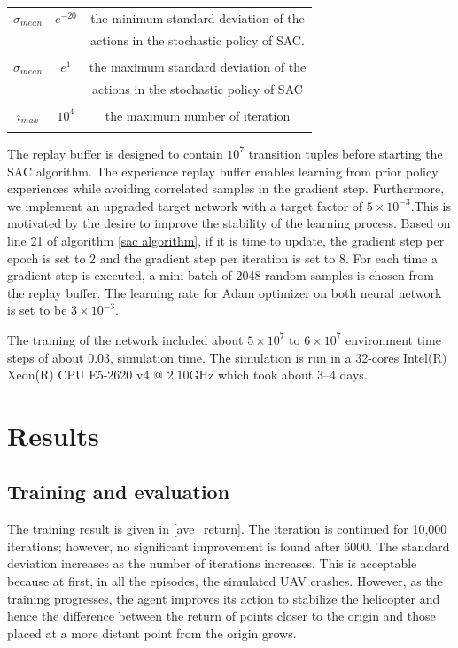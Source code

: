 \begin{longtable}{c|c|c}
$\sigma_{mean}$  & $e^{-20}$  & the minimum standard deviation of the\\&& actions in the stochastic policy of SAC.\\&& \\ \hline
$\sigma_{mean}$  & $e^{1}$  &  the maximum standard deviation of the\\&& actions in the stochastic policy of SAC\\&& \\ \hline
$i_{max}$  & $10^4$  &  the maximum  number of iteration\\&& \\ \hline
\end{longtable}

The replay buffer is designed to contain $10^7$ transition tuples before starting the SAC algorithm. The experience replay buffer enables learning from prior policy experiences while avoiding correlated samples in the gradient step. Furthermore, we implement an upgraded target network with a target factor of $5\times10^{-3}$.This is motivated by the desire to improve the stability of the learning process. Based on line 21 of algorithm \ref{sac algorithm}, if it is time to update, the gradient step  per epoch is set to 2 and the gradient step per iteration is set to 8. For each time a gradient step is executed, a mini-batch of 2048 random samples is chosen from the replay buffer. The learning rate for Adam optimizer on both neural network is set to be $3\times10^{-3}$.

The training of the network included about $5\times10^{7}$ to  $6\times10^{7}$ environment time steps of about 0.03, simulation time. The simulation is run in a 32-cores Intel(R) Xeon(R) CPU E5-2620 v4 @ 2.10GHz which took about 3–4 days.

\section{Results}

\subsection{Training and evaluation}

The training result is given in \ref{ave_return}. The iteration is continued for 10,000 iterations; however, no significant improvement is found after 6000. The standard deviation increases as the number of iterations increases. This is acceptable because at first, in all the episodes, the simulated UAV crashes. However, as the training progresses, the agent improves its action to stabilize the helicopter and hence the difference between the return of points closer to the origin and those placed at a more distant point from the origin grows.

